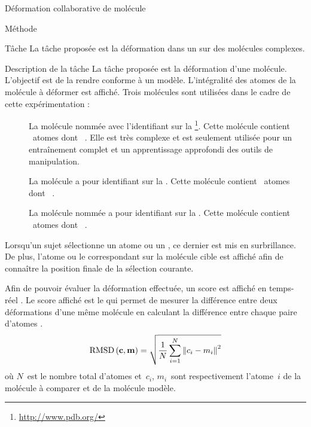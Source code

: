 \documentclass[myfrancais]{mythesis}
\begin{document}
\begin{mychapter}{Déformation collaborative de molécule}
\begin{mysection}{Méthode}
\begin{mysubsection}{Tâche}
				La tâche proposée est la déformation dans un  sur des molécules complexes.
				\begin{mysubsubsection}{Description de la tâche}
					La tâche proposée est la déformation d'une molécule.
					L'objectif est de la rendre conforme à un modèle.
					L'intégralité des atomes de la molécule à déformer est affiché.
					Trois molécules sont utilisées dans le cadre de cette expérimentation :
					\begin{description}
						\item[\myPrion]
							La molécule nommée \myPrion {} avec l'identifiant \myPDB {} sur la \myPDBbase\footnote{\url{http://www.pdb.org/}}.
							Cette molécule contient ~atomes dont ~.
							Elle est très complexe et est seulement utilisée pour un entraînement complet et un apprentissage approfondi des outils de manipulation.
						\item[\myTRPZIPPER]
							La molécule \myTRPZIPPER {} a pour identifiant \myPDB {} sur la \myPDBbase\footnotemark[\value{footnote}].
							Cette molécule contient ~atomes dont ~.
						\item[\myTRPCAGE]
							La molécule nommée \myTRPCAGE {} a pour identifiant \myPDB {} sur la \myPDBbase\footnotemark[\value{footnote}].
							Cette molécule contient ~atomes dont ~.
					\end{description}

					Lorsqu'un sujet sélectionne un atome ou un , ce dernier est mis en surbrillance.
					De plus, l'atome ou le  correspondant sur la molécule cible est affiché afin de connaître la position finale de la sélection courante.

					Afin de pouvoir évaluer la déformation effectuée, un score est affiché en temps-réel .
					Le score affiché est le  qui permet de mesurer la différence entre deux déformations d'une même molécule en calculant la différence entre chaque paire d'atomes .
					\begin{equation}\label{equ-RMSD}
						\mathrm{RMSD}\left(\mathbf{c},\mathbf{m}\right) = \sqrt{\frac{1}{N}\sum_{i=1}^{N}\left\| c_i - m_i \right\|^2}
					\end{equation}
					où $N$~est le nombre total d'atomes et~$c_i$, $m_i$~sont respectivement l'atome~$i$ de la molécule à comparer et de la molécule modèle.


\end{mysubsubsection}
\end{mysubsection}
\end{mysection}
\end{mychapter}
\end{document}
